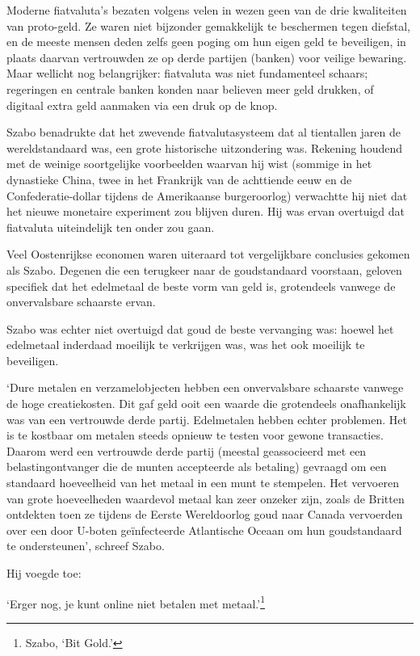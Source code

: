 \documentclass[
  a5paper,
  smalldemyvopaper,11pt,twoside,onecolumn,openright,extrafontsizes]{memoir}
\begin{document}
Moderne fiatvaluta's bezaten volgens velen in wezen geen van de drie
kwaliteiten van proto-geld. Ze waren niet bijzonder gemakkelijk te
beschermen tegen diefstal, en de meeste mensen deden zelfs geen poging
om hun eigen geld te beveiligen, in plaats daarvan vertrouwden ze op
derde partijen (banken) voor veilige bewaring. Maar wellicht nog
belangrijker: fiatvaluta was niet fundamenteel schaars; regeringen en
centrale banken konden naar believen meer geld drukken, of digitaal
extra geld aanmaken via een druk op de knop.

Szabo benadrukte dat het zwevende fiatvalutasysteem dat al tientallen
jaren de wereldstandaard was, een grote historische uitzondering was.
Rekening houdend met de weinige soortgelijke voorbeelden waarvan hij
wist (sommige in het dynastieke China, twee in het Frankrijk van de
achttiende eeuw en de Confederatie-dollar tijdens de Amerikaanse
burgeroorlog) verwachtte hij niet dat het nieuwe monetaire experiment
zou blijven duren. Hij was ervan overtuigd dat fiatvaluta uiteindelijk
ten onder zou gaan.

Veel Oostenrijkse economen waren uiteraard tot vergelijkbare conclusies
gekomen als Szabo. Degenen die een terugkeer naar de goudstandaard
voorstaan, geloven specifiek dat het edelmetaal de beste vorm van geld
is, grotendeels vanwege de onvervalsbare schaarste ervan.

Szabo was echter niet overtuigd dat goud de beste vervanging was: hoewel
het edelmetaal inderdaad moeilijk te verkrijgen was, was het ook
moeilijk te beveiligen.

`Dure metalen en verzamelobjecten hebben een onvervalsbare schaarste
vanwege de hoge creatiekosten. Dit gaf geld ooit een waarde die
grotendeels onafhankelijk was van een vertrouwde derde partij.
Edelmetalen hebben echter problemen. Het is te kostbaar om metalen
steeds opnieuw te testen voor gewone transacties. Daarom werd een
vertrouwde derde partij (meestal geassocieerd met een belastingontvanger
die de munten accepteerde als betaling) gevraagd om een standaard
hoeveelheid van het metaal in een munt te stempelen. Het vervoeren van
grote hoeveelheden waardevol metaal kan zeer onzeker zijn, zoals de
Britten ontdekten toen ze tijdens de Eerste Wereldoorlog goud naar
Canada vervoerden over een door U-boten geïnfecteerde Atlantische Oceaan
om hun goudstandaard te ondersteunen', schreef Szabo.

Hij voegde toe:

`Erger nog, je kunt online niet betalen met metaal.'\footnote{Szabo,
  `Bit Gold.'}
\end{document}
